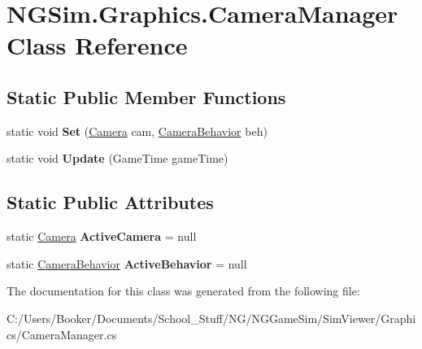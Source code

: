 \hypertarget{class_n_g_sim_1_1_graphics_1_1_camera_manager}{}\section{N\+G\+Sim.\+Graphics.\+Camera\+Manager Class Reference}
\label{class_n_g_sim_1_1_graphics_1_1_camera_manager}
\subsection*{Static Public Member Functions}
\begin{DoxyCompactItemize}
\item 
\mbox{\label{class_n_g_sim_1_1_graphics_1_1_camera_manager_a712cfcc974ba5df03e5a3144dc7cd8aa}} 
static void {\bfseries Set} (\hyperlink{class_n_g_sim_1_1_graphics_1_1_camera}{Camera} cam, \hyperlink{class_n_g_sim_1_1_graphics_1_1_camera_behavior}{Camera\+Behavior} beh)
\item 
\mbox{\label{class_n_g_sim_1_1_graphics_1_1_camera_manager_a80d76910ffa0179d797b74fbcc54a6eb}} 
static void {\bfseries Update} (Game\+Time game\+Time)
\end{DoxyCompactItemize}
\subsection*{Static Public Attributes}
\begin{DoxyCompactItemize}
\item 
\mbox{\label{class_n_g_sim_1_1_graphics_1_1_camera_manager_a307db372059e43985e3c790bd5cbde1a}} 
static \hyperlink{class_n_g_sim_1_1_graphics_1_1_camera}{Camera} {\bfseries Active\+Camera} = null
\item 
\mbox{\label{class_n_g_sim_1_1_graphics_1_1_camera_manager_a25e5575f70b936f5a35bba8754de1038}} 
static \hyperlink{class_n_g_sim_1_1_graphics_1_1_camera_behavior}{Camera\+Behavior} {\bfseries Active\+Behavior} = null
\end{DoxyCompactItemize}


The documentation for this class was generated from the following file\+:\begin{DoxyCompactItemize}
\item 
C\+:/\+Users/\+Booker/\+Documents/\+School\+\_\+\+Stuff/\+N\+G/\+N\+G\+Game\+Sim/\+Sim\+Viewer/\+Graphics/Camera\+Manager.\+cs\end{DoxyCompactItemize}
